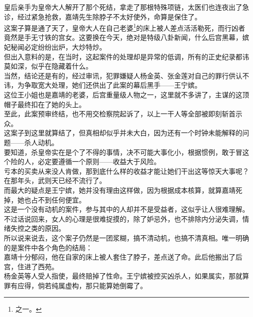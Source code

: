 \begin{multicols}{\theparacolNo}
皇后亲手为皇帝大人解开了那个死结，拿走了那根特殊项链，太医们也连夜出了急诊，经过紧急抢救，嘉靖先生除脖子不太好使外，命算是保住了。\\

这案子算是通了天了，皇帝大人在自己老婆\footnote{之一。}的床上被人差点活活勒死，而行凶者竟然是手无寸铁的宫女。这要换在今天，绝对是特级八卦新闻，什么后宫黑幕，嫔妃秘闻必定纷纷出炉，大炒特炒。\\

但出入意料的是，在当时，这起案件的处理却是异常的低调，所有的正史纪录都讳莫如深，似乎在隐藏着什么。\\

当然，结论还是有的，经过审讯，犯罪嫌疑人杨金英、张金莲对自己的罪行供认不讳，为争取宽大处理，她们还供出了此案的幕后黑手——王宁嫔。\\

这位王小姐也是嘉靖的老婆，后宫重量级人物之一，这里就不多讲了，主谋的这顶帽子最终扣在了她的头上。\\

至此，此案预审终结，也不用交检察院起诉了，以上一干人等全部被即刻斩首示众。\\

这案子到这里就算结了，但真相却似乎并未大白，因为还有一个时钟未能解释的问题——杀人动机。\\

要知道，杀皇帝实在是个了不得的事情，决不可能大事化小，根据惯例，敢于冒这个险的人，必定要遵循一个原则——收益大于风险。\\

亏本的买卖从来没人肯做，那到底什么样的收益才能让她们干出这等惊天大事呢？在那年头，武则天已经不流行了。\\

而最大的疑点是王宁嫔，她并没有理由这样做，因为根据成本核算，就算嘉靖死掉，她也占不到任何便宜。\\

这是一个没有动机的案件，参与其中的人却并不是受益者，这似乎让人很难理解。不过话说回来，女人的心理是很难捉摸的，除了妒忌外，也不排除内分泌失调，情绪失控之类的原因。\\

所以说来说去，这个案子仍然是一团浆糊，搞不清动机，也搞不清真相。唯一明确的是案件中各个角色的结局：\\

嘉靖十分郁闷，他在自家的床上被人套住了脖子，差点送了命。此后他搬出了后宫，住进了西苑。\\

杨金英等人受人指使，最终赔掉了性命。王宁嫔被控买凶杀人，如果属实，那就算罪有应得，倘若纯属虚构，那只能算她倒霉了。\\


\end{multicols}
